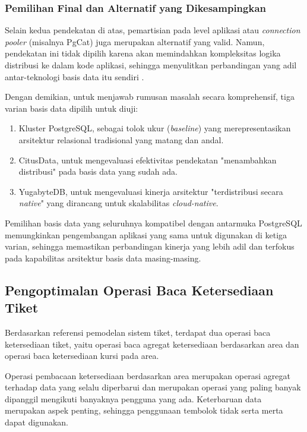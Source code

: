\subsubsection{Pemilihan Final dan Alternatif yang Dikesampingkan}

Selain kedua pendekatan di atas, pemartisian pada level aplikasi atau \textit{connection pooler} (misalnya PgCat) juga merupakan alternatif yang valid. Namun, pendekatan ini tidak dipilih karena akan memindahkan kompleksitas logika distribusi ke dalam kode aplikasi, sehingga menyulitkan perbandingan yang adil antar-teknologi basis data itu sendiri \parencite{pgcat}.

Dengan demikian, untuk menjawab rumusan masalah secara komprehensif, tiga varian basis data dipilih untuk diuji:
\begin{enumerate}
    \item Kluster PostgreSQL, sebagai tolok ukur (\textit{baseline}) yang merepresentasikan arsitektur relasional tradisional yang matang dan andal.
    \item CitusData, untuk mengevaluasi efektivitas pendekatan "menambahkan distribusi" pada basis data yang sudah ada.
    \item YugabyteDB, untuk mengevaluasi kinerja arsitektur "terdistribusi secara \textit{native}" yang dirancang untuk skalabilitas \textit{cloud-native}.
\end{enumerate}

Pemilihan basis data yang seluruhnya kompatibel dengan antarmuka PostgreSQL memungkinkan pengembangan aplikasi yang sama untuk digunakan di ketiga varian, sehingga memastikan perbandingan kinerja yang lebih adil dan terfokus pada kapabilitas arsitektur basis data masing-masing.

\subsection{Pengoptimalan Operasi Baca Ketersediaan Tiket}

Berdasarkan referensi pemodelan sistem tiket, terdapat dua operasi baca ketersediaan tiket, yaitu operasi baca agregat ketersediaan berdasarkan area dan operasi baca ketersediaan kursi pada area.

Operasi pembacaan ketersediaan berdasarkan area merupakan operasi agregat terhadap data yang selalu diperbarui dan merupakan operasi yang paling banyak dipanggil mengikuti banyaknya pengguna yang ada. Keterbaruan data merupakan aspek penting, sehingga penggunaan tembolok tidak serta merta dapat digunakan.

